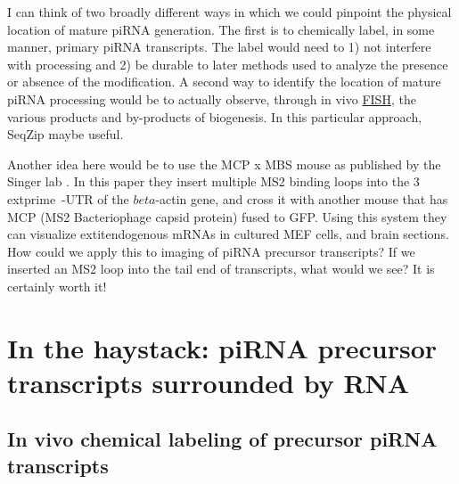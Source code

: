 {{    I can think of two broadly different ways in which we could pinpoint the physical location of mature piRNA generation. The first is to chemically label, in some manner, primary piRNA transcripts. The label would need to 1) not interfere with processing and 2) be durable to later methods used to analyze the presence or absence of the modification. A second way to identify the location of mature piRNA processing would be to actually observe, through in vivo \hyperref[hd:abrevs]{FISH}, the various products and by-products of biogenesis. In this particular approach, SeqZip maybe useful.

    Another idea here would be to use the MCP x MBS mouse as published by the Singer lab \citep{Park2014}. In this paper they insert multiple MS2 binding loops into the 3  extprime~-UTR of the $beta$-actin gene, and cross it with another mouse that has MCP (MS2 Bacteriophage capsid protein) fused to GFP. Using this system they can visualize   extit{endogenous} mRNAs in cultured MEF cells, and brain sections. How could we apply this to imaging of piRNA precursor transcripts? If we inserted an MS2 loop into the tail end of transcripts, what would we see? It is certainly worth it!


\section{In the haystack: piRNA precursor transcripts surrounded by RNA}

  \subsection{In vivo chemical labeling of precursor piRNA transcripts}
    
}}

